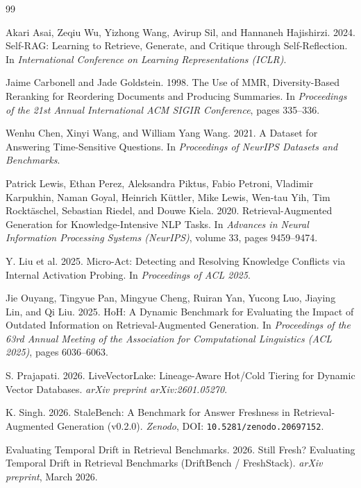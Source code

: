 \documentclass[11pt,a4paper]{article}
\theoremstyle{definition}
\begin{document}
\begin{thebibliography}{99}

Akari Asai, Zeqiu Wu, Yizhong Wang, Avirup Sil, and Hannaneh Hajishirzi. 2024.
Self-RAG: Learning to Retrieve, Generate, and Critique through Self-Reflection.
In \emph{International Conference on Learning Representations (ICLR)}.

Jaime Carbonell and Jade Goldstein. 1998.
The Use of MMR, Diversity-Based Reranking for Reordering Documents and Producing Summaries.
In \emph{Proceedings of the 21st Annual International ACM SIGIR Conference}, pages 335--336.

Wenhu Chen, Xinyi Wang, and William Yang Wang. 2021.
A Dataset for Answering Time-Sensitive Questions.
In \emph{Proceedings of NeurIPS Datasets and Benchmarks}.

Patrick Lewis, Ethan Perez, Aleksandra Piktus, Fabio Petroni, Vladimir Karpukhin, Naman Goyal, Heinrich K\"{u}ttler, Mike Lewis, Wen-tau Yih, Tim Rockt\"{a}schel, Sebastian Riedel, and Douwe Kiela. 2020.
Retrieval-Augmented Generation for Knowledge-Intensive NLP Tasks.
In \emph{Advances in Neural Information Processing Systems (NeurIPS)}, volume 33, pages 9459--9474.

Y. Liu et al. 2025.
Micro-Act: Detecting and Resolving Knowledge Conflicts via Internal Activation Probing.
In \emph{Proceedings of ACL 2025}.

Jie Ouyang, Tingyue Pan, Mingyue Cheng, Ruiran Yan, Yucong Luo, Jiaying Lin, and Qi Liu. 2025.
HoH: A Dynamic Benchmark for Evaluating the Impact of Outdated Information on Retrieval-Augmented Generation.
In \emph{Proceedings of the 63rd Annual Meeting of the Association for Computational Linguistics (ACL 2025)}, pages 6036--6063.

S. Prajapati. 2026.
LiveVectorLake: Lineage-Aware Hot/Cold Tiering for Dynamic Vector Databases.
\emph{arXiv preprint arXiv:2601.05270}.

K. Singh. 2026.
StaleBench: A Benchmark for Answer Freshness in Retrieval-Augmented Generation (v0.2.0).
\emph{Zenodo}, DOI: \texttt{10.5281/zenodo.20697152}.

Evaluating Temporal Drift in Retrieval Benchmarks. 2026.
Still Fresh? Evaluating Temporal Drift in Retrieval Benchmarks (DriftBench / FreshStack).
\emph{arXiv preprint}, March 2026.


\end{thebibliography}
\end{document}
